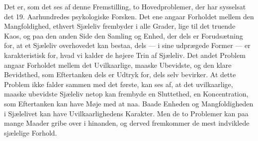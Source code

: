 \documentclass[12pt,a4paper,openany]{book}
\newcommand{\opage}[1]{\marginnote{\footnotesize\textit{[#1]}}}
\begin{document}
Det er, som det ses af denne Fremstilling, to Hovedproblemer, der
har sysselsat det 19. Aarhundredes psykologiske Forsken. Det ene
angaar Forholdet mellem den Mangfoldighed, ethvert Sjæleliv frembyder
i alle Grader, lige til det truende Kaos, og paa den anden Side
\opage{51}den Samling og Enhed, der dels er Forudsætning for, at et Sjæleliv
overhovedet kan bestaa, dels --- i sine udprægede Former --- er karakteristisk
for, hvad vi kalder de højere Trin af Sjæleliv. Det andet
Problem angaar Forholdet mellem det Uvilkaarlige, maaske Ubevidste,
og den klare Bevidsthed, som Eftertanken dels er Udtryk for,
dels selv bevirker. At dette Problem ikke falder sammen med det
første, kan ses af, at det uvilkaarlige, maaske ubevidste Sjæleliv
netop kan frembyde en Sluttethed, en Koncentration, som Eftertanken
kan have Møje med at naa. Baade Enheden og Mangfoldigheden
i Sjælelivet kan have Uvilkaarlighedens Karakter. Men de to Problemer
kan paa mange Maader gribe over i hinanden, og derved
fremkommer de mest indviklede sjælelige Forhold.
\end{document}
